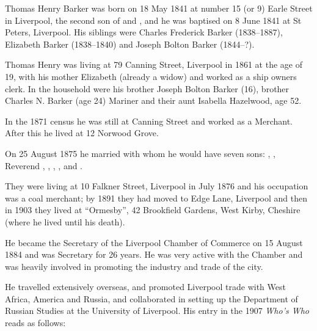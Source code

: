 
Thomas Henry Barker was born on 18 May 1841\cite{THBbirth} at number 15 (or 9\cite{THBbirth}) Earle Street in Liverpool,\cite{THBplantagenets} the second son of  and , and he was baptised on 8 June 1841 at St Peters, Liverpool.\cite{THBarkerBaptism} His siblings were Charles Frederick Barker (1838--1887),  Elizabeth Barker (1838--1840) and Joseph Bolton Barker (1844--?).

Thomas Henry was living at 79 Canning Street, Liverpool in 1861 at the age of 19, with his mother Elizabeth (already a widow) and worked as a ship owners clerk.  In the household were his brother Joseph Bolton Barker (16), brother Charles N. Barker (age 24) Mariner and their aunt Isabella Hazelwood, age 52.

In the 1871 census he was still at Canning Street and worked as a Merchant. After this he lived at 12 Norwood Grove\cite{THBcensus}.

On 25 August 1875 he married \cite{THBmarriage} with whom he would have seven sons:\cite{THBplantagenets} , , Reverend , , , 
, and .

They were living at 10 Falkner Street, Liverpool in July 1876 and his occupation was a coal merchant\cite{THBoccupation};
by 1891 they had moved to Edge Lane, Liverpool\cite{THBresidence} and then in 1903 they lived at ``Ormesby'', 42 Brookfield Gardens, West Kirby, Cheshire (where he lived until his death).\cite{THBdeathcert}

He became the Secretary of the Liverpool Chamber of Commerce on 15 August 1884 and was Secretary for 26 years.  He was very active with the Chamber and was heavily involved in promoting the industry and trade of the city.  

He travelled extensively overseas, and promoted Liverpool trade with West Africa, America and Russia, and collaborated in setting up the Department of Russian Studies at the University of Liverpool. His entry in  the 1907 \emph{Who's Who} reads as follows:

